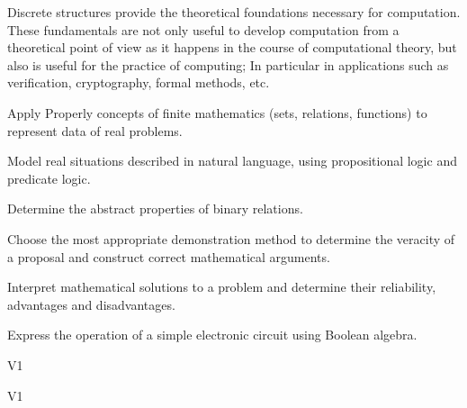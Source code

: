 \begin{syllabus}


\begin{justification}

Discrete structures provide the theoretical foundations necessary for computation. These fundamentals are not only useful to develop computation from a theoretical point of view as it happens 
in the course of computational theory, but also is useful for the practice of computing; In particular in applications such as verification,
cryptography, formal methods, etc.

\end{justification}

\begin{goals}
\item Apply Properly concepts of finite mathematics (sets, relations, functions) to represent data of real problems.
\item Model real situations described in natural language, using propositional logic and predicate logic.
\item Determine the abstract properties of binary relations.
\item Choose the most appropriate demonstration method to determine the veracity of a proposal and construct correct mathematical arguments.
\item Interpret mathematical solutions to a problem and determine their reliability, advantages and disadvantages.
\item Express the operation of a simple electronic circuit using Boolean algebra.
\end{goals}

\begin{outcomes}{V1}
    \item {}
    \item {}
\end{outcomes}

\begin{specificoutcomes}{V1}
    \item {}
    \item {}
    \item {}
    \item {}
    \item {}
\end{specificoutcomes}


\end{syllabus}
